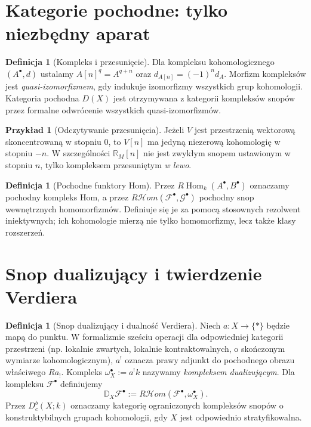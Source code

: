 \documentclass[11pt,a4paper,oneside]{report}
\newcommand{\R}{\mathbb{R}}
\theoremstyle{plain}
\theoremstyle{definition}
\newtheorem{definicja}[twierdzenie]{Definicja}
\newtheorem{przyklad}[twierdzenie]{Przykład}
\theoremstyle{remark}
\begin{document}
\section{Kategorie pochodne: tylko niezbędny aparat}
\begin{definicja}[Kompleks i przesunięcie]
Dla kompleksu kohomologicznego $(A^\bullet,d)$ ustalamy
$A[n]^q=A^{q+n}$ oraz $d_{A[n]}=(-1)^n d_A$.
Morfizm kompleksów jest \emph{quasi-izomorfizmem}, gdy
indukuje izomorfizmy wszystkich grup kohomologii.
Kategoria pochodna $D(X)$ jest otrzymywana z kategorii
kompleksów snopów przez formalne odwrócenie wszystkich
quasi-izomorfizmów.
\end{definicja}

\begin{przyklad}[Odczytywanie przesunięcia]
Jeżeli $V$ jest przestrzenią wektorową skoncentrowaną
w stopniu $0$, to $V[n]$ ma jedyną niezerową kohomologię
w stopniu $-n$. W szczególności $\R_M[n]$ nie jest
zwykłym snopem ustawionym w stopniu $n$, tylko
kompleksem przesuniętym \emph{w lewo}.
\end{przyklad}

\begin{definicja}[Pochodne funktory Hom]
Przez $R\!\operatorname{Hom}_k(A^\bullet,B^\bullet)$
oznaczamy pochodny kompleks Hom, a przez
$R\mathcal Hom(\mathcal F^\bullet,\mathcal G^\bullet)$
pochodny snop wewnętrznych homomorfizmów.
Definiuje się je za pomocą stosownych rezolwent
iniektywnych; ich kohomologie mierzą nie tylko
homomorfizmy, lecz także klasy rozszerzeń.
\end{definicja}

\section{Snop dualizujący i twierdzenie Verdiera}
\begin{definicja}[Snop dualizujący i dualność Verdiera]
\label{def:verdier-v12}
Niech $a:X\to\{*\}$ będzie mapą do punktu.
W formalizmie sześciu operacji dla odpowiedniej kategorii
przestrzeni (np. lokalnie zwartych, lokalnie kontraktowalnych,
o skończonym wymiarze kohomologicznym), $a^!$ oznacza
prawy adjunkt do pochodnego obrazu właściwego $Ra_!$.
Kompleks
$\omega_X^\bullet:=a^!k$ nazywamy \emph{kompleksem dualizującym}.
Dla kompleksu $\mathcal F^\bullet$ definiujemy
\[
\mathbb D_X\mathcal F^\bullet
:=R\mathcal Hom(\mathcal F^\bullet,\omega_X^\bullet).
\]
Przez $D^b_c(X;k)$ oznaczamy kategorię ograniczonych
kompleksów snopów o konstruktybilnych grupach kohomologii,
gdy $X$ jest odpowiednio stratyfikowalna.
\end{definicja}
\end{document}
